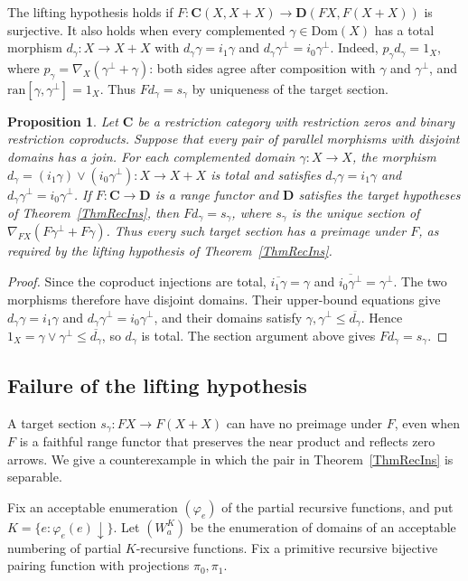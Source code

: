 \documentclass[letterpaper,10pt]{amsart}
\theoremstyle{plain}
\newtheorem{prop}{Proposition}[thm]
\theoremstyle{definition}
\newcommand{\rst}[1]{\overline{#1}}
\begin{document}
The lifting hypothesis holds if
$F:\mathbf C(X,X+X)\to\mathbf D(FX,F(X+X))$ is surjective. It also holds
when every complemented $\gamma\in\mathrm{Dom}(X)$ has a total
morphism $d_\gamma:X\to X+X$ with
$d_\gamma\gamma=i_1\gamma$ and
$d_\gamma\gamma^\perp=i_0\gamma^\perp$. Indeed,
$p_\gamma d_\gamma=1_X$, where
$p_\gamma=\nabla_X(\gamma^\perp+\gamma)$: both sides agree after
composition with $\gamma$ and $\gamma^\perp$, and
$\mathrm{ran}[\gamma,\gamma^\perp]=1_X$. Thus $Fd_\gamma=s_\gamma$
by uniqueness of the target section.

\begin{prop}\label{PropDisjointJoins}
Let $\mathbf C$ be a restriction category with restriction zeros and
binary restriction coproducts. Suppose that every pair of parallel
morphisms with disjoint domains has a join. For each complemented
domain $\gamma:X\to X$, the morphism
$d_\gamma=(i_1\gamma)\vee(i_0\gamma^\perp):X\to X+X$
is total and satisfies $d_\gamma\gamma=i_1\gamma$ and
$d_\gamma\gamma^\perp=i_0\gamma^\perp$.
If $F:\mathbf C\to\mathbf D$ is a range functor and $\mathbf D$
satisfies the target hypotheses of Theorem~\ref{ThmRecIns}, then
$Fd_\gamma=s_\gamma$, where $s_\gamma$ is the unique section of
$\nabla_{FX}(F\gamma^\perp+F\gamma)$. Thus every such target section
has a preimage under $F$, as required by the lifting hypothesis of
Theorem~\ref{ThmRecIns}.
\end{prop}
\begin{proof}
Since the coproduct injections are total,
$\rst{i_1\gamma}=\gamma$ and
$\rst{i_0\gamma^\perp}=\gamma^\perp$. The two morphisms therefore
have disjoint domains. Their upper-bound equations give
$d_\gamma\gamma=i_1\gamma$ and
$d_\gamma\gamma^\perp=i_0\gamma^\perp$, and their domains satisfy
$\gamma,\gamma^\perp\le\rst{d_\gamma}$. Hence
$1_X=\gamma\vee\gamma^\perp\le\rst{d_\gamma}$, so $d_\gamma$ is
total. The section argument above gives $Fd_\gamma=s_\gamma$.
\end{proof}

\subsection{Failure of the lifting hypothesis}\label{sec:counterexample}
A target section $s_\gamma:FX\to F(X+X)$ can have no preimage
under $F$, even when $F$ is a faithful range functor that preserves
the near product and reflects zero arrows. We give a counterexample
in which the pair in Theorem~\ref{ThmRecIns} is separable.

Fix an acceptable enumeration $(\varphi_e)$ of the partial recursive
functions, and put $K=\{e:\varphi_e(e)\downarrow\}$. Let $(W_a^K)$
be the enumeration of domains of an acceptable numbering of partial
$K$-recursive functions. Fix a primitive recursive bijective pairing
function with projections $\pi_0,\pi_1$.
\end{document}
